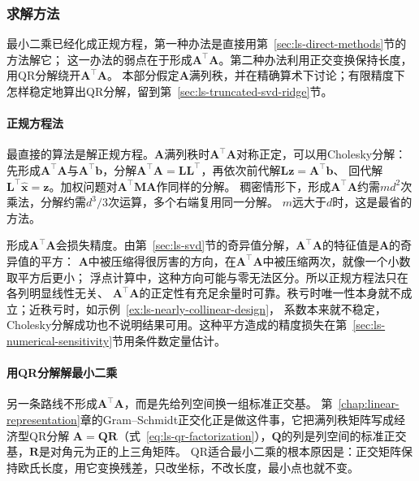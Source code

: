 \subsubsection{求解方法}
\label{sec:ls-direct-methods-ls}

最小二乘已经化成正规方程，第一种办法是直接用第~\ref{sec:ls-direct-methods}节的方法解它；
这一办法的弱点在于形成$\bm A^\top\bm A$。第二种办法利用正交变换保持长度，用QR分解绕开$\bm A^\top\bm A$。
本部分假定$\bm A$满列秩，并在精确算术下讨论；有限精度下怎样稳定地算出QR分解，留到第~\ref{sec:ls-truncated-svd-ridge}节。

\paragraph{正规方程法}
\label{sec:ls-normal-equations-method}

最直接的算法是解正规方程。$\bm A$满列秩时$\bm A^\top\bm A$对称正定，可以用Cholesky分解：
先形成$\bm A^\top\bm A$与$\bm A^\top\bm b$，分解$\bm A^\top\bm A=\bm L\bm L^\top$，再依次前代解$\bm L\bm z=\bm A^\top\bm b$、
回代解$\bm L^\top\hat{\bm x}=\bm z$。加权问题对$\bm A^\top\bm M\bm A$作同样的分解。
稠密情形下，形成$\bm A^\top\bm A$约需$md^2$次乘法，分解约需$d^3/3$次运算，多个右端复用同一分解。
$m$远大于$d$时，这是最省的方法。

形成$\bm A^\top\bm A$会损失精度。由第~\ref{sec:ls-svd}节的奇异值分解，$\bm A^\top\bm A$的特征值是$\bm A$的奇异值的平方：
$\bm A$中被压缩得很厉害的方向，在$\bm A^\top\bm A$中被压缩两次，就像一个小数取平方后更小；
浮点计算中，这种方向可能与零无法区分。所以正规方程法只在各列明显线性无关、
$\bm A^\top\bm A$的正定性有充足余量时可靠。秩亏时唯一性本身就不成立；近秩亏时，如示例~\ref{ex:ls-nearly-collinear-design}，
系数本来就不稳定，Cholesky分解成功也不说明结果可用。这种平方造成的精度损失在第~\ref{sec:ls-numerical-sensitivity}节用条件数定量估计。

\paragraph{用QR分解解最小二乘}
\label{sec:ls-qr-method}
\label{sec:linear-algebra-direct-residual}

另一条路线不形成$\bm A^\top\bm A$，而是先给列空间换一组标准正交基。
第~\ref{chap:linear-representation}章的Gram--Schmidt正交化正是做这件事，它把满列秩矩阵写成经济型QR分解
$\bm A=\bm Q\bm R$（式~\eqref{eq:ls-qr-factorization}），$\bm Q$的列是列空间的标准正交基，$\bm R$是对角元为正的上三角矩阵。
QR适合最小二乘的根本原因是：正交矩阵保持欧氏长度，用它变换残差，只改坐标，不改长度，最小点也就不变。

